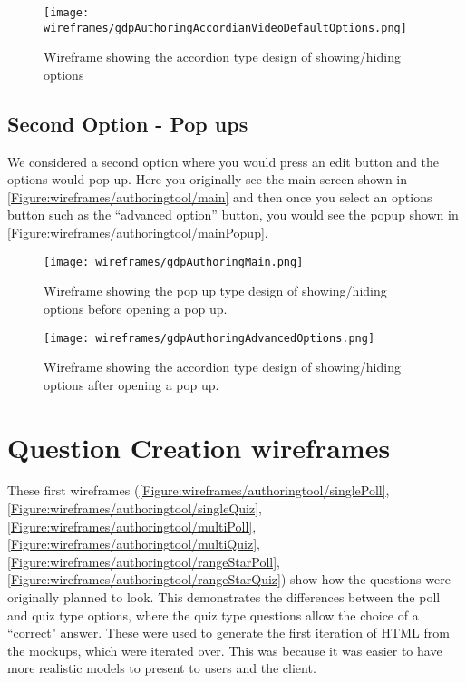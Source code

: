 \begin{figure}
	\texttt{[image: wireframes/gdpAuthoringAccordianVideoDefaultOptions.png]}
	\caption{Wireframe showing the accordion type design of showing/hiding options}
	\label{Figure:wireframes/authoringtool/accordion}
\end{figure}

\subsection{Second Option - Pop ups}

We considered a second option where you would press an edit button and the options would pop up. Here you originally see the main screen shown in \autoref{Figure:wireframes/authoringtool/main} and then once you select an options button such as the ``advanced option'' button, you would see the popup shown in \autoref{Figure:wireframes/authoringtool/mainPopup}.

\begin{landscape}

\begin{figure}
	\texttt{[image: wireframes/gdpAuthoringMain.png]}
	\caption{Wireframe showing the pop up type design of showing/hiding options before opening a pop up.}
	\label{Figure:wireframes/authoringtool/main}
\end{figure}

\begin{figure}
	\texttt{[image: wireframes/gdpAuthoringAdvancedOptions.png]}
	\caption{Wireframe showing the accordion type design of showing/hiding options after opening a pop up.}
	\label{Figure:wireframes/authoringtool/mainPopup}
\end{figure}
\end{landscape}


\section{Question Creation wireframes}

These first wireframes (\autoref{Figure:wireframes/authoringtool/singlePoll}, \autoref{Figure:wireframes/authoringtool/singleQuiz}, \autoref{Figure:wireframes/authoringtool/multiPoll}, \autoref{Figure:wireframes/authoringtool/multiQuiz}, \autoref{Figure:wireframes/authoringtool/rangeStarPoll}, \autoref{Figure:wireframes/authoringtool/rangeStarQuiz}) show how the questions were originally planned to look. This demonstrates the differences between the poll and quiz type options, where the quiz type questions allow the choice of a ``correct" answer. These were used to generate the first iteration of HTML from the mockups, which were iterated over. This was because it was easier to have more realistic models to present to users and the client.

